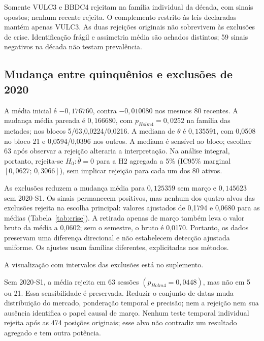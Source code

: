 Somente VULC3 e BBDC4 rejeitam na família individual da década, com
sinais opostos; nenhum recente rejeita. O complemento restrito às leis
declaradas mantém apenas VULC3. As duas rejeições originais não sobrevivem
às exclusões de crise. Identificação frágil e assimetria média são achados
distintos; 59 sinais negativos na década não testam prevalência.

\subsection{Mudança entre quinquênios e exclusões de 2020}
A média inicial é $-0,176760$, contra $-0,010080$ nos mesmos 80 recentes.
A mudança média pareada é $0,166680$, com $p_{Holm4}=0,0252$ na família das metades;
nos blocos 5/63,0,0224/0,0216. A mediana de $\theta $ é $0,135591$,
com 0,0508 no bloco 21 e 0,0594/0,0396 nos outros. A mediana é sensível
ao bloco; escolher 63 após observar a rejeição alteraria a interpretação.
Na análise integral, portanto, rejeita-se $H_0:\overline{\theta}=0$ para
a H2 agregada a 5\% (IC95\% marginal $[0,0627;\,0,3066]$), sem implicar
rejeição para cada um dos 80 ativos.

As exclusões reduzem a mudança média para $0,125359$ sem março
e $0,145623$ sem 2020-S1. Os sinais permanecem positivos, mas nenhum
dos quatro alvos das exclusões rejeita na escolha principal: valores ajustados
de 0,1794 e 0,0680 para as médias (Tabela~\ref{tab:crise}).
A retirada apenas de março também leva o valor bruto da média a 0,0602;
sem o semestre, o bruto é 0,0170. Portanto, os dados preservam uma
diferença direcional e não estabelecem detecção ajustada uniforme.
Os ajustes usam famílias diferentes, explicitadas nos métodos.

\begin{table}[htbp]\centering\small
\caption{Mudança pareada dos 80. $p_{21}$: bruto; $p^*$: ajustado no bloco
indicado. Integral e exclusões usam famílias distintas de quatro alvos.}
\label{tab:crise}
\end{table}
A visualização com intervalos das exclusões está no suplemento.


Sem 2020-S1, a média rejeita em 63 sessões $(p_{Holm4}=0,0448)$,
mas não em 5 ou 21. Essa sensibilidade é preservada. Reduzir o conjunto
de datas muda distribuição do mercado, ponderação temporal e precisão;
nem a rejeição nem sua ausência identifica o papel causal de março.
Nenhum teste temporal individual rejeita após as 474 posições originais;
esse alvo não contradiz um resultado agregado e tem outra potência.

